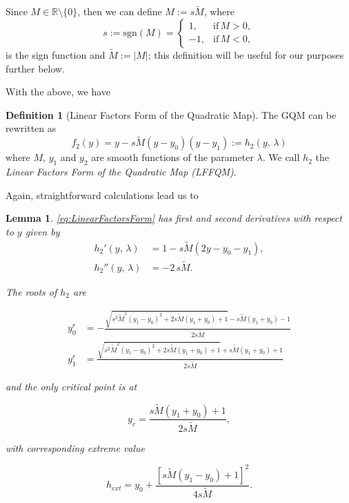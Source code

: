 \documentclass[10pt,twoside,titlepage]{book}
\numberwithin{equation}{chapter}
\numberwithin{figure}{chapter}
\numberwithin{table}{chapter}
\theoremstyle{plain}%
\newtheorem{lem}[thm]{Lemma}
\theoremstyle{definition}
\newtheorem{defn}{Definition}[chapter]
\theoremstyle{remark}
\begin{document}
Since $M\in\mathbb{R}\setminus\{0\}$, then we can define $M:=s\tilde{M}$, where
\begin{equation}
	s:=\mathrm{sgn}(M)=
	\begin{cases}
		1, &\mathrm{if}\,M>0,\\
		-1,&\mathrm{if}\,M<0,
	\end{cases}
\end{equation}
is the sign function and $\tilde{M}:=|M|$; this definition will be useful for our purposes further below.

With the above, we have

\begin{defn}[Linear Factors Form of the Quadratic Map]
	\label{def:LFFQM}
	The GQM can be rewritten as
	\begin{equation}
		f_2(y)=y-s\tilde{M}(y-y_0)(y-y_1):=h_2(y,\,\lambda)
		\label{eq:LinearFactorsForm}
	\end{equation}
	where $M,\,y_1$ and $y_2$ are smooth functions of the parameter $\lambda$. We call $h_2$ the \emph{Linear Factors Form of the Quadratic Map (LFFQM)}.
\end{defn}

Again, straightforward calculations lead us to

\begin{lem}
	\eqref{eq:LinearFactorsForm} has first and second derivatives with respect to $y$ given by
	\begin{equation}
		\begin{aligned}
			h_2'(y,\,\lambda) &= 1-s\tilde{M}\left(2y-y_0-y_1\right),\\
			h_2''(y,\,\lambda) &= -2\,s\tilde{M}.
		\end{aligned}
	\end{equation}
	
	The roots of $h_2$ are
	
	\begin{equation}
		\begin{aligned}
			y_0^r &= -\frac{\sqrt{s^2\tilde{M}^2(y_1-y_0)^2+2s\tilde{M}(y_1+y_0)+1}-s\tilde{M}(y_1+y_0)-1}{2s\tilde{M}}\\
			y_1^r &= \frac{\sqrt{s^2\tilde{M}^2(y_1-y_0)^2+2s\tilde{M}(y_1+y_0)+1}+s\tilde{M}(y_1+y_0)+1}{2s\tilde{M}}
		\end{aligned}
	\end{equation}
	
	and the only critical point is at
	
	\[y_c=\frac{s\tilde{M}(y_1+y_0)+1}{2s\tilde{M}},\]
	
	with corresponding extreme value
	
	\[h_{ext}=y_0+\frac{[s\tilde{M}(y_1-y_0)+1]^2}{4s\tilde{M}}.\]
\end{lem}
\end{document}
